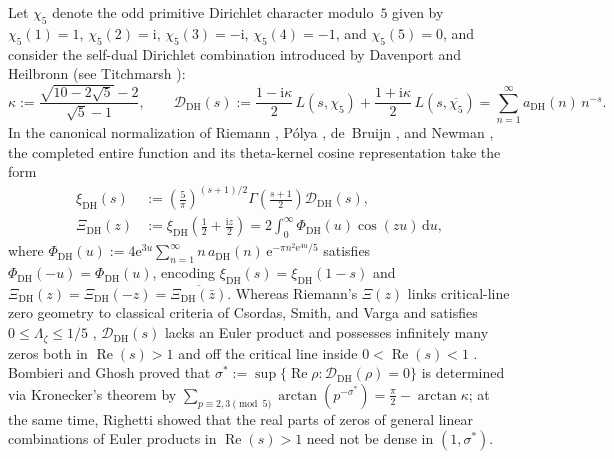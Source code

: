 \documentclass[11pt,a4paper,reqno]{amsart}
\theoremstyle{definition}
\theoremstyle{remark}
\numberwithin{equation}{section}
\newcommand{\dd}{\mathrm{d}}
\newcommand{\ii}{\mathrm{i}}
\newcommand{\ee}{\mathrm{e}}
\DeclareMathOperator{\Reop}{Re}
\begin{document}
Let $\chi_5$ denote the odd primitive Dirichlet character modulo~$5$ given by $\chi_5(1)=1$, $\chi_5(2)=\ii$, $\chi_5(3)=-\ii$, $\chi_5(4)=-1$, and $\chi_5(5)=0$, and consider the self-dual Dirichlet combination introduced by Davenport and Heilbronn \cite{davenport1936} (see Titchmarsh \cite[\S 10.25]{titchmarsh1986}):
\begin{equation}
  \kappa := \frac{\sqrt{10 - 2\sqrt{5}} - 2}{\sqrt{5} - 1},
  \qquad
  \mathcal{D}_{\mathrm{DH}}(s) := \frac{1 - \ii\kappa}{2}\,L(s,\chi_5) + \frac{1 + \ii\kappa}{2}\,L(s,\overline{\chi_5})
  = \sum_{n=1}^{\infty} a_{\mathrm{DH}}(n)\,n^{-s}.
  \label{eq:dh-series}
\end{equation}
In the canonical normalization of Riemann \cite{riemann1859}, P\'olya \cite{polya1926,polya1927}, de~Bruijn \cite{debruijn1950}, and Newman \cite{newman1976}, the completed entire function and its theta-kernel cosine representation take the form
\begin{equation}
  \begin{aligned}
    \xi_{\mathrm{DH}}(s) &:= \left(\frac{5}{\pi}\right)^{(s+1)/2}\Gamma\!\left(\frac{s+1}{2}\right)\mathcal{D}_{\mathrm{DH}}(s), \\
    \Xi_{\mathrm{DH}}(z) &:= \xi_{\mathrm{DH}}\!\left(\tfrac{1}{2} + \tfrac{\ii z}{2}\right)
    = 2\int_{0}^{\infty} \Phi_{\mathrm{DH}}(u)\cos(zu)\,\dd u,
  \end{aligned}
  \label{eq:xi-dh}
\end{equation}
where $\Phi_{\mathrm{DH}}(u) := 4\ee^{3u}\sum_{n=1}^{\infty} n\,a_{\mathrm{DH}}(n)\,\ee^{-\pi n^2 \ee^{4u}/5}$ satisfies $\Phi_{\mathrm{DH}}(-u) = \Phi_{\mathrm{DH}}(u)$, encoding $\xi_{\mathrm{DH}}(s) = \xi_{\mathrm{DH}}(1-s)$ and $\Xi_{\mathrm{DH}}(z) = \Xi_{\mathrm{DH}}(-z) = \overline{\Xi_{\mathrm{DH}}(\bar{z})}$. Whereas Riemann's $\Xi(z)$ links critical-line zero geometry to classical criteria of Csordas, Smith, and Varga \cite{csordas1994} and satisfies $0 \le \Lambda_\zeta \le 1/5$ \cite{rodgerstao2020,polymath2019,platt2021}, $\mathcal{D}_{\mathrm{DH}}(s)$ lacks an Euler product and possesses infinitely many zeros both in $\Reop(s) > 1$ and off the critical line inside $0 < \Reop(s) < 1$ \cite{davenport1936,spira1994,balanzario2007,bombieri2011}. Bombieri and Ghosh \cite{bombieri2011} proved that $\sigma^* := \sup\{\Reop\rho : \mathcal{D}_{\mathrm{DH}}(\rho)=0\}$ is determined via Kronecker's theorem by $\sum_{p \equiv 2,3 \pmod{5}}\arctan(p^{-\sigma^*}) = \frac{\pi}{2} - \arctan\kappa$; at the same time, Righetti \cite{righetti2017} showed that the real parts of zeros of general linear combinations of Euler products in $\Reop(s) > 1$ need not be dense in $(1, \sigma^*)$.
\end{document}
